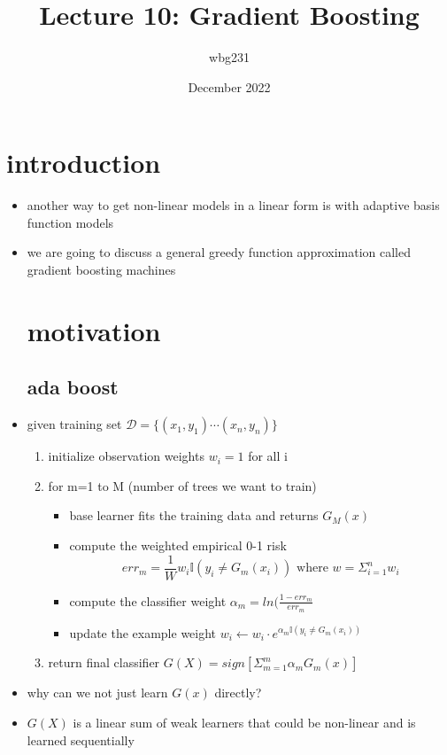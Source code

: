 \documentclass{article}
\title{Lecture 10: Gradient Boosting}
\author{wbg231 }
\date{December 2022}
\begin{document}
\maketitle

\section*{introduction}
\begin{itemize}
\subsection*{today's lecture}
\item another way to get non-linear models in a linear form is with adaptive basis function models 
\item we are going to discuss a general greedy function approximation called gradient boosting machines 
\section{motivation}
\subsection{ada boost}
\item given training set $\mathcal{D}=\{(x_1,y_1)\cdots (x_n,y_n)\}$
\begin{enumerate}
    \item initialize observation weights $w_i=1$ for all i 
    \item for m=1 to M (number of trees we want to train) 
    \begin{itemize}
        \item base learner fits the training data and returns $G_M(x)$
        \item compute the weighted empirical 0-1 risk $$err_{m}=\frac{1}{W}w_i\mathbb{I}(y_i\neq G_m(x_i)) \text{   where } w=\Sigma_{i=1}^{n}w_i$$
        \item compute the classifier weight $\alpha_m=ln(\frac{1-err_m}{err_m}$
        \item update the example weight $w_i\leftarrow w_i \cdot e^{\alpha_m \mathbb{I}(y_i\neq G_m(x_i))}$
    \end{itemize}
    \item return final classifier $G(X)=sign[\Sigma_{m=1}^{m}\alpha_m G_m(x)]$
\end{enumerate}
\item why can we not just learn $G(x)$ directly? 
\item $G(X)$ is a linear sum of weak learners that could be non-linear and is learned sequentially 

\end{itemize}
\end{document}
